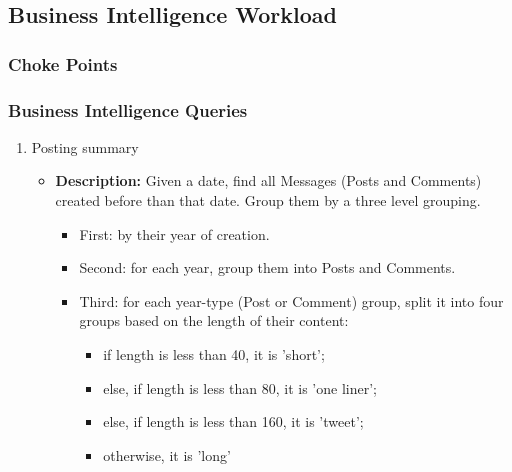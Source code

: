 \subsection{Business Intelligence Workload}
\subsubsection{Choke Points}

\subsubsection{Business Intelligence Queries}

{\small
    \begin{enumerate}
      \item Posting summary 
            \begin{itemize}
                \item \textbf{Description:}
                  Given a date, find all Messages (Posts and Comments) created before than that date.
                  Group them by a three level grouping.

                  \begin{itemize}
                    \item First: by their year of creation.
                    \item Second: for each year, group them into Posts and Comments.
                    \item Third: for each year-type (Post or Comment) group, split it into four groups based on the
                              length of their content: 
                              \begin{itemize}
                                \item if length is less than 40, it is 'short'; 
                                \item else, if length is less than 80, it is 'one liner';
                                \item else, if length is less than 160, it is 'tweet';
                                \item otherwise, it is 'long'
                              \end{itemize}
                  \end{itemize}


\end{itemize}
\end{enumerate}}
